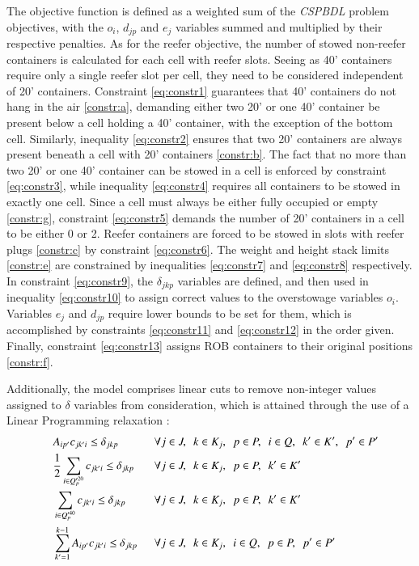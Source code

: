 \documentclass[preprint,11pt,3p]{elsarticle}
\begin{document}
The objective function is defined as a weighted sum of the \textit{CSPBDL} problem objectives, with the $o_i$, $d_{jp}$ and $e_j$ variables summed and multiplied by their respective penalties. As for the reefer objective, the number of stowed non-reefer containers is calculated for each cell with reefer slots. Seeing as 40' containers require only a single reefer slot per cell, they need to be considered independent of 20' containers. 
Constraint \eqref{eq:constr1} guarantees that 40' containers do not hang in the air \ref{constr:a}, demanding either two 20' or one 40' container be present below a cell holding a 40' container, with the exception of the bottom cell. Similarly, inequality \eqref{eq:constr2} ensures that two 20' containers are always present beneath a cell with 20' containers \ref{constr:b}. The fact that no more than two 20' or one 40' container can be stowed in a cell is enforced by constraint \eqref{eq:constr3}, while inequality \eqref{eq:constr4} requires all containers to be stowed in exactly one cell. Since a cell must always be either fully occupied or empty \ref{constr:g}, constraint \eqref{eq:constr5} demands the number of 20' containers in a cell to be either 0 or 2. Reefer containers are forced to be stowed in slots with reefer plugs \ref{constr:c} by constraint \eqref{eq:constr6}. The weight and height stack limits \ref{constr:e} are constrained by inequalities \eqref{eq:constr7} and \eqref{eq:constr8} respectively. In constraint \eqref{eq:constr9}, the $\delta_{jkp}$ variables are defined, and then used in inequality \eqref{eq:constr10} to assign correct values to the overstowage variables $o_i$. Variables $e_j$ and $d_{jp}$ require lower bounds to be set for them, which is accomplished by constraints \eqref{eq:constr11} and \eqref{eq:constr12} in the order given. Finally, constraint \eqref{eq:constr13} assigns ROB containers to their original positions \ref{constr:f}.

Additionally, the model comprises linear cuts to remove non-integer values assigned to $\delta$ variables from consideration, which is attained through the use of a Linear Programming relaxation \cite{DJJRA12}:
\small
\begin{alignat}{4} 
    \quad & A_{ip'}c_{jk'i} \leq \delta_{jkp} && \forall j \in J, \enskip  k \in K_j, \enskip p \in P, \enskip i \in Q, \enskip k' \in K', \enskip p' \in P' \label{eq:constr14}\\
    \quad & \frac{1}{2} \sum_{i \in Q'^{20}_{p}} c_{jk'i} \leq \delta_{jkp} \enskip && \forall j \in J, \enskip k \in K_j, \enskip p \in P, \enskip k' \in K' \label{eq:constr15}\\
    \quad & \sum_{i \in Q'^{40}_{p}} c_{jk'i} \leq \delta_{jkp} && \forall j \in J, \enskip k \in K_j, \enskip p \in P, \enskip k' \in K' \label{eq:constr16}\\
    \quad & \sum_{k'=1}^{k-1} A_{ip'}c_{jk'i} \leq \delta_{jkp} \enskip && \forall j \in J, \enskip k \in K_j, \enskip i \in Q, \enskip p \in P, \enskip p' \in P' \label{eq:constr17}
\end{alignat}
\normalsize
\end{document}

